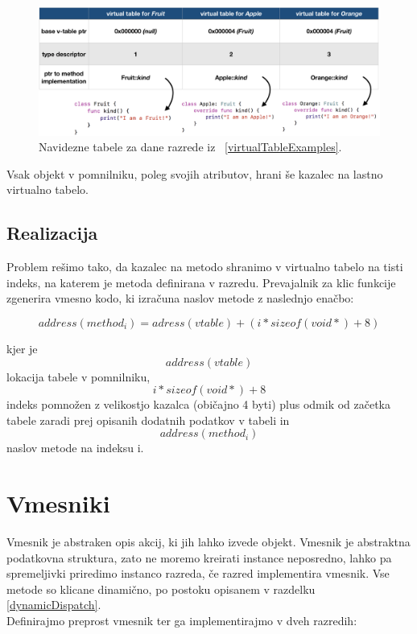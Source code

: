 \documentclass[a4paper, 12p]{book}
\begin{document}
\begin{figure}[h]
	\begin{center}
		\includegraphics[width=1\textwidth]{resources/vtables.png}
	\end{center}
	\caption{Navidezne tabele za dane razrede iz ~\ref{virtualTableExamples}.}
	\label{vtables}
\end{figure}

\indent Vsak objekt v pomnilniku, poleg svojih atributov, hrani še kazalec na lastno virtualno tabelo.

\subsection{Realizacija}

Problem rešimo tako, da kazalec na metodo shranimo v virtualno tabelo na tisti indeks, na katerem je metoda definirana v razredu. Prevajalnik za klic funkcije zgenerira vmesno kodo, ki izračuna naslov metode z naslednjo enačbo:

\[ address(method_i) = adress(vtable) + (i * sizeof(void*) + 8) \]

kjer je \[address(vtable)\] lokacija tabele v pomnilniku, \[i * sizeof(void*) + 8\] indeks pomnožen z velikostjo kazalca (običajno 4 byti) plus odmik od začetka tabele zaradi prej opisanih dodatnih podatkov v tabeli in \[address(method_i)\] naslov metode na indeksu i.

\section{Vmesniki}

Vmesnik je abstraken opis akcij, ki jih lahko izvede objekt. Vmesnik je abstraktna podatkovna struktura, zato ne moremo kreirati instance neposredno, lahko pa spremeljivki priredimo instanco razreda, če razred implementira vmesnik. Vse metode so klicane dinamično, po postoku opisanem v razdelku \ref{dynamicDispatch}. \\
\indent Definirajmo preprost vmesnik ter ga implementirajmo v dveh razredih:
\end{document}
